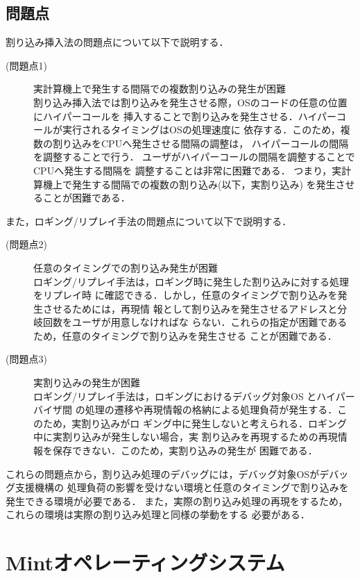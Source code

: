 \documentclass[tanilab-enum]{graduate}
\begin{document}
\section{問題点}\label{mondai}
割り込み挿入法の問題点について以下で説明する．
\begin{description}
    \item[(問題点1)]実計算機上で発生する間隔での複数割り込みの発生が困難\\
        割り込み挿入法では割り込みを発生させる際，OSのコードの任意の位置にハイパーコールを
        挿入することで割り込みを発生させる．ハイパーコールが実行されるタイミングはOSの処理速度に
        依存する．このため，複数の割り込みをCPUへ発生させる間隔の調整は，
        ハイパーコールの間隔を調整することで行う．
        ユーザがハイパーコールの間隔を調整することでCPUへ発生する間隔を
        調整することは非常に困難である．
        つまり，実計算機上で発生する間隔での複数の割り込み(以下，実割り込み)
        を発生させることが困難である．
\end{description}
また，ロギング/リプレイ手法の問題点について以下で説明する．
\begin{description}
    \item[(問題点2)]任意のタイミングでの割り込み発生が困難\\
        ロギング/リプレイ手法は，ロギング時に発生した割り込みに対する処理をリプレイ時
        に確認できる．しかし，任意のタイミングで割り込みを発生させるためには，再現情
        報として割り込みを発生させるアドレスと分岐回数をユーザが用意しなければな
        らない．これらの指定が困難であるため，任意のタイミングで割り込みを発生させる
        ことが困難である．
    \item[(問題点3)]実割り込みの発生が困難\\
        ロギング/リプレイ手法は，ロギングにおけるデバッグ対象OS とハイパーバイザ間
        の処理の遷移や再現情報の格納による処理負荷が発生する．このため，実割り込みがロ
        ギング中に発生しないと考えられる．ロギング中に実割り込みが発生しない場合，実
        割り込みを再現するための再現情報を保存できない．このため，実割り込みの発生が
        困難である．
\end{description}
これらの問題点から，割り込み処理のデバッグには，デバッグ対象OSがデバッグ支援機構の
処理負荷の影響を受けない環境と任意のタイミングで割り込みを発生できる環境が必要である．
また，実際の割り込み処理の再現をするため，これらの環境は実際の割り込み処理と同様の挙動をする
必要がある．
\chapter{Mintオペレーティングシステム}\label{chap:Mint}
\end{document}
